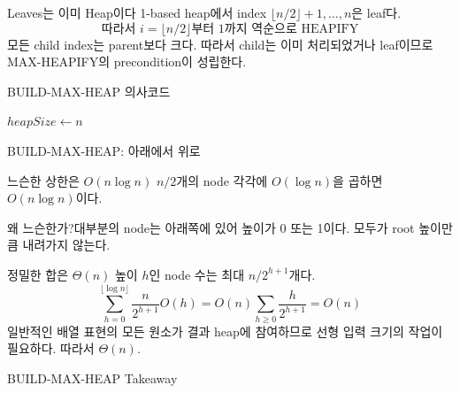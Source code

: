 \begin{frame}{Leaves는 이미 Heap이다}
1-based heap에서 index $\lfloor n/2\rfloor+1,\dots,n$은 leaf다.
\[\text{따라서 }i=\lfloor n/2\rfloor\text{부터 }1\text{까지 역순으로 HEAPIFY}\]
모든 child index는 parent보다 크다. 따라서 child는 이미 처리되었거나 leaf이므로 MAX-HEAPIFY의 precondition이 성립한다.
\end{frame}
\begin{frame}{BUILD-MAX-HEAP 의사코드}
\begin{algorithmic}[1]\State $heapSize\gets n$\State {}\EndFor\EndProcedure\end{algorithmic}
\end{frame}
\begin{frame}{BUILD-MAX-HEAP: 아래에서 위로}
\centering{}
\end{frame}
\begin{frame}{느슨한 상한은 $O(n\log n)$}
$n/2$개의 node 각각에 $O(\log n)$을 곱하면 $O(n\log n)$이다.
\begin{alertblock}{왜 느슨한가?}대부분의 node는 아래쪽에 있어 높이가 0 또는 1이다. 모두가 root 높이만큼 내려가지 않는다.\end{alertblock}
\end{frame}
\begin{frame}{정밀한 합은 $\Theta(n)$}
\optional[Advanced]\hfill
높이 $h$인 node 수는 최대 $n/2^{h+1}$개다.
\[\sum_{h=0}^{\lfloor\log n\rfloor}\frac{n}{2^{h+1}}O(h)=O(n)\sum_{h\ge0}\frac{h}{2^{h+1}}=O(n)\]
일반적인 배열 표현의 모든 원소가 결과 heap에 참여하므로 선형 입력 크기의 작업이 필요하다. 따라서 \alert{$\Theta(n)$}.
\end{frame}
\begin{frame}{BUILD-MAX-HEAP Takeaway}
\end{frame}
